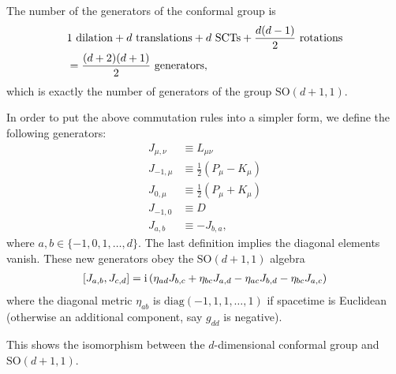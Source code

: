 \documentclass[10pt]{article}
\newcommand{\ii}{\mathrm{i}}
\begin{document}
\begin{remark}
    The number of the generators of the conformal group is
    \begin{align}
        &1\ \mathrm{dilation}+d\ \mathrm{translations}+d\ \mathrm{SCTs}+\frac{d(d-1)}{2}\ \mathrm{rotations}\notag\\
        &=\frac{(d+2)(d+1)}{2}\ \mathrm{generators},
    \end{align}
    which is exactly the number of generators of the group $\mathrm{SO}(d+1,1)$.

    In order to put the above commutation rules into a simpler form, we define the following generators\snm: 
    \begin{align}
        J_{\mu,\nu}&\equiv L_{\mu\nu}\\
        J_{-1,\mu}&\equiv \frac{1}{2}(P_\mu-K_\mu)\\
        J_{0,\mu}&\equiv \frac{1}{2}(P_\mu+K_\mu)\\
        J_{-1,0}&\equiv D\\
        J_{a,b}&\equiv-J_{b,a},
    \end{align}
    where $a,b\in\{-1,0,1,\dots,d\}$.
    The last definition implies the diagonal elements vanish.
    These new generators obey the $\mathrm{SO}(d+1,1)$ algebra 
    \begin{align}
        \comm{J_{a,b}}{J_{c,d}}=\ii\left(\eta_{ad}J_{b,c}+\eta_{bc}J_{a,d}-\eta_{ac}J_{b,d}-\eta_{bc}J_{a,c}\right)
    \end{align}
    where the diagonal metric $\eta_{ab}$ is $\mathrm{diag}(-1,1,1,\dots,1)$ if spacetime is Euclidean (otherwise an additional component, say $g_{dd}$ is negative).

    This shows the isomorphism between the $d$-dimensional conformal group and $\mathrm{SO}(d+1,1)$. 
\end{remark}
\end{document}
